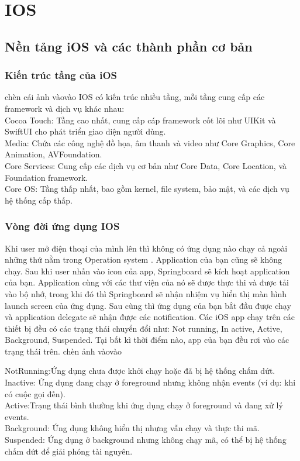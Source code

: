 \chapter{IOS}
\label{chap:introduction}



\section{Nền tảng iOS và các thành phần cơ bản}
    \subsection{Kiến trúc tầng của iOS}
    \begin{flushleft}
        chèn cái ảnh vàovào
        IOS có kiến trúc nhiều tầng, mỗi tầng cung cấp các framework và dịch vụ khác nhau:\\
            Cocoa Touch: Tầng cao nhất, cung cấp cáp framework cốt lõi như UIKit và SwiftUI cho phát triển giao diện người dùng.\\
            Media: Chứa các công nghệ đồ họa, âm thanh và video như Core Graphics, Core Animation, AVFoundation.\\
            Core Services: Cung cấp các dịch vụ cơ bản như Core Data, Core Location, và Foundation framework.\\
            Core OS: Tầng thấp nhất, bao gồm kernel, file system, bảo mật, và các dịch vụ hệ thống cấp thấp.\\
       
    \end{flushleft}
   \subsection{ Vòng đời ứng dụng IOS}	
   \begin{flushleft}
    Khi user mở điện thoại của mình lên thì không có ứng dụng nào chạy cả ngoài những thứ nằm trong Operation system . Application của bạn cũng sẽ không chạy. Sau khi user nhấn vào icon của app, Springboard sẽ kích hoạt application của bạn. Application cùng với các thư viện của nó sẽ được thực thi và được tải vào bộ nhớ, trong khi đó thì Springboard sẽ nhận nhiệm vụ hiển thị màn hình launch screen của ứng dụng. Sau cùng thì ứng dụng của bạn bắt đầu được chạy và application delegate sẽ nhận được các notification.
Các iOS app chạy trên các thiết bị đều có các trạng thái chuyển đổi như: Not running, In active, Active, Background, Suspended. Tại bất kì thời điểm nào, app của bạn đều rơi vào các trạng thái trên.
chèn ảnh vàovào
   \end{flushleft}
   \begin{flushleft}
    NotRunning:Ứng dụng chưa được khởi chạy hoặc đã bị hệ thống chấm dứt.
    Inactive: Ứng dụng đang chạy ở foreground nhưng không nhận events (ví dụ: khi có cuộc gọi đến).\\
    Active:Trạng thái bình thường khi ứng dụng chạy ở foreground và đang xử lý events.\\
    Background: Ứng dụng không hiển thị nhưng vẫn chạy và thực thi mã.\\
    Suspended: Ứng dụng ở background nhưng không chạy mã, có thể bị hệ thống chấm dứt để giải phóng tài nguyên.
   \end{flushleft}
